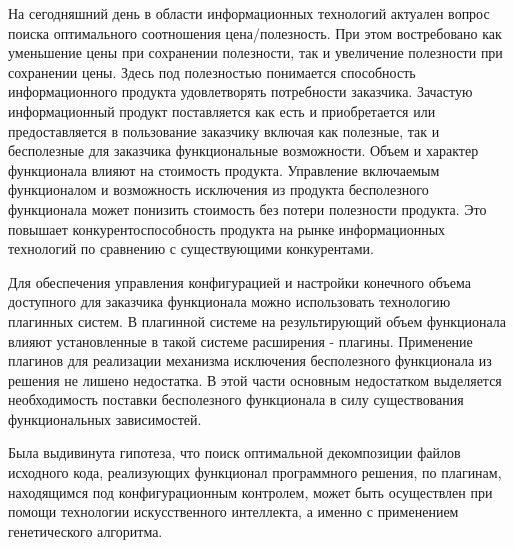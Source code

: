 



На сегодняшний день в области информационных технологий актуален вопрос поиска оптимального соотношения цена/полезность. При этом востребовано как уменьшение цены при сохранении полезности, так и увеличение полезности при сохранении цены. Здесь под полезностью понимается способность информационного продукта удовлетворять потребности заказчика. Зачастую информационный продукт поставляется как есть и приобретается или предоставляется в пользование заказчику включая как полезные, так и бесполезные для заказчика функциональные возможности. Объем и характер функционала влияют на стоимость продукта. Управление включаемым функционалом и возможность исключения из продукта бесполезного функционала может понизить стоимость без потери полезности продукта. Это повышает конкурентоспособность продукта на рынке информационных технологий по сравнению с существующими конкурентами.

Для обеспечения управления конфигурацией и настройки конечного объема доступного для заказчика функционала можно использовать технологию плагинных систем. В плагинной системе на результирующий объем функционала влияют установленные в такой системе расширения - плагины. Применение плагинов для реализации механизма исключения бесполезного функционала из решения не лишено недостатка. В этой части основным недостатком выделяется необходимость поставки бесполезного функционала в силу существования функциональных зависимостей.

Была выдивинута гипотеза, что поиск оптимальной декомпозиции файлов исходного кода, реализующих функционал программного решения, по плагинам, находящимся под конфигурационным контролем, может быть осуществлен при помощи технологии искусственного интеллекта, а именно с применением генетического алгоритма.

